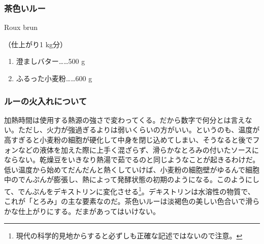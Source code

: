 \begin{recette}

\hypertarget{roux-brun}{%
\subsubsection{茶色いルー}\label{roux-brun}}

\begin{frsubenv}

Roux brun

\end{frsubenv}

 
 

（仕上がり1 kg分）

\begin{enumerate}
\def\labelenumi{\arabic{enumi}.}
\tightlist
\item
  澄ましバター\ldots{}\ldots{}500 g
\item
  ふるった小麦粉\ldots{}\ldots{}600 g
\end{enumerate}

\atoaki{}

\hypertarget{cuisson-des-roux}{%
\subsubsection{ルーの火入れについて}\label{cuisson-des-roux}}


加熱時間は使用する熱源の強さで変わってくる。だから数字で何分とは言えない。ただし、火力が強過ぎるよりは弱いくらいの方がいい。というのも、温度が高すぎると小麦粉の細胞が硬化して中身を閉じ込めてしまい、そうなると後でフォンなどの液体を加えた際に上手く混ざらず、滑らかなとろみの付いたソースにならない。乾燥豆をいきなり熱湯で茹でるのと同じようなことが起きるわけだ。低い温度から始めてだんだんと熱くしていけば、小麦粉の細胞壁がゆるんで細胞中のでんぷんが膨張し、熱によって発酵状態の初期のようになる。このようにして、でんぷんをデキストリンに変化させる\footnote{現代の科学的見地からすると必ずしも正確な記述ではないので注意。}。デキストリンは水溶性の物質で、これが「とろみ」の主な要素なのだ。茶色いルーは淡褐色の美しい色合いで滑らかな仕上がりにする。だまがあってはいけない。


\end{recette}
